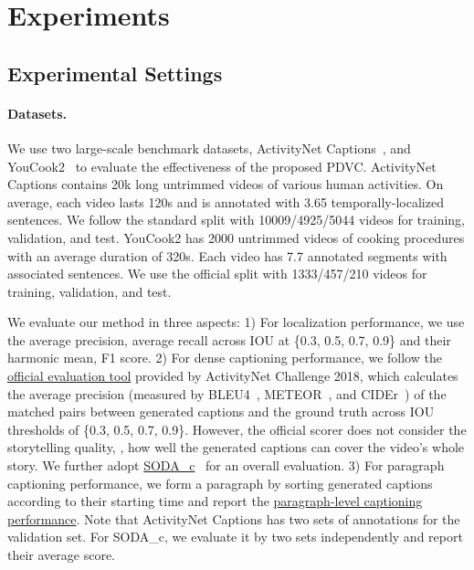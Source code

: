\section{Experiments}

\subsection{Experimental Settings}

\paragraph{Datasets.}
We use two large-scale benchmark datasets, ActivityNet Captions~\cite{krishna2017dense}, and YouCook2~\cite{zhou2018towards} to evaluate the effectiveness of the proposed PDVC. ActivityNet Captions contains 20k long untrimmed videos of various human activities. On average, each video lasts 120s and is annotated with 3.65 temporally-localized sentences. We follow the standard split with 10009/4925/5044 videos for training, validation, and test. YouCook2 has 2000 untrimmed videos of cooking procedures with an average duration of 320s. Each video has 7.7 annotated segments with associated sentences. We use the official split with 1333/457/210 videos for training, validation, and test. 

\vspace{0.5em}
We evaluate our method in three aspects:  1) For localization performance, we use the average precision, average recall across IOU at \{0.3, 0.5, 0.7, 0.9\}  and their harmonic mean, F1 score. 2)  For dense captioning performance, we follow the \href{https://github.com/ranjaykrishna/densevid_eval/tree/deba7d7e83012b218a4df888f6c971e21cfeea33}{official evaluation tool} provided by ActivityNet Challenge 2018, which calculates the average precision (measured by BLEU4~\cite{papineni2002bleu}, METEOR~\cite{lavie2005meteor}, and CIDEr~\cite{vedantam2015cider}) of the matched pairs between generated captions and the ground truth across IOU thresholds of \{0.3, 0.5, 0.7, 0.9\}. However, the official scorer does not consider the storytelling quality, \ie, how well the generated captions can cover the video's whole story. We further adopt \href{https://github.com/fujiso/SODA/tree/22671b3570e088217139bcb1e4de7a3499c30294}{SODA\_c}~\cite{fujitasoda} for an overall evaluation. 3) For paragraph captioning performance, we form a paragraph by sorting generated captions according to their starting time and report the \href{https://github.com/jayleicn/recurrent-transformer/tree/3c31d2444c178ccbc78998d2ae1d4910b02b95ae/densevid_eval}{paragraph-level captioning performance}.
Note that ActivityNet Captions has two sets of annotations for the validation set. For SODA\_c, we evaluate it by two sets independently and report their average score.

